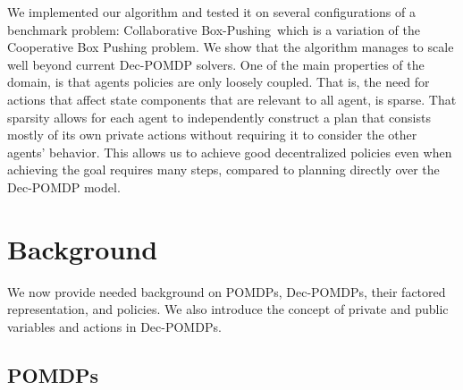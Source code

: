\documentclass[letterpaper]{article} %
\theoremstyle{definition}
\newcommand{\cbp}[0]{Collaborative Box-Pushing}
\begin{document}
We implemented our algorithm and tested it on several configurations of a benchmark problem: \cbp\ which is a variation of the Cooperative Box Pushing problem. We show that the algorithm manages to scale well beyond
current Dec-POMDP solvers.
One of the main properties of the domain, is that agents policies are only loosely coupled. That is, the need for actions that affect state components that are relevant to all agent, is sparse. That sparsity allows for each agent to independently construct a plan that consists mostly of its own private actions without requiring it to consider the other agents' behavior. This allows us to achieve good decentralized policies even when achieving the goal requires many steps, compared to planning directly over the Dec-POMDP model.






\section{Background}

We now provide needed background on POMDPs, Dec-POMDPs, their factored representation, and policies. We also introduce the concept of private and public variables and actions in Dec-POMDPs.


\subsection{POMDPs}
\end{document}
